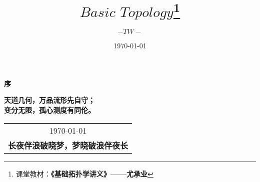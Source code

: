 \title{{\Huge{\textbf{$Basic \,\, Topology$\footnote{课堂教材：\textbf{《基础拓扑学讲义》——尤承业}}}}}}
\author{$-TW-$}
\date{\today}
\maketitle                   %

\thispagestyle{empty}        %
\begin{center}
	\Huge\textbf{序}
\end{center}


\vspace*{3em}
\begin{center}
	\large{\textbf{天道几何，万品流形先自守；}}\\
	
	\large{\textbf{变分无限，孤心测度有同伦。}}
\end{center}

\vspace*{3em}
\begin{flushright}
	\begin{tabular}{c}
		\today \\ \small{\textbf{长夜伴浪破晓梦，梦晓破浪伴夜长}}
	\end{tabular}
\end{flushright}


\newpage                      %
\pagestyle{plain}             %
\setcounter{page}{1}          %
\tableofcontents              %

\newpage                      %
\pagestyle{plain}
\setcounter{page}{1}          %
\setcounter{chapter}{0}    %